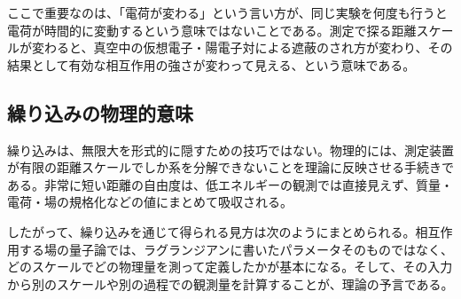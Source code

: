 ここで重要なのは、「電荷が変わる」という言い方が、同じ実験を何度も行うと電荷が時間的に変動するという意味ではないことである。測定で探る距離スケールが変わると、真空中の仮想電子・陽電子対による遮蔽のされ方が変わり、その結果として有効な相互作用の強さが変わって見える、という意味である。

\subsection{繰り込みの物理的意味}
繰り込みは、無限大を形式的に隠すための技巧ではない。物理的には、測定装置が有限の距離スケールでしか系を分解できないことを理論に反映させる手続きである。非常に短い距離の自由度は、低エネルギーの観測では直接見えず、質量・電荷・場の規格化などの値にまとめて吸収される。

したがって、繰り込みを通じて得られる見方は次のようにまとめられる。相互作用する場の量子論では、ラグランジアンに書いたパラメータそのものではなく、どのスケールでどの物理量を測って定義したかが基本になる。そして、その入力から別のスケールや別の過程での観測量を計算することが、理論の予言である。
